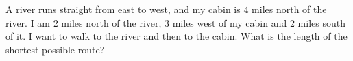 A river runs straight from east to west, and my cabin is $4$ miles north of the river. I am $2$ miles north of the river, $3$ miles west of my cabin and $2$ miles south of it. I want to walk to the river and then to the cabin. What is the length of the shortest possible route?
